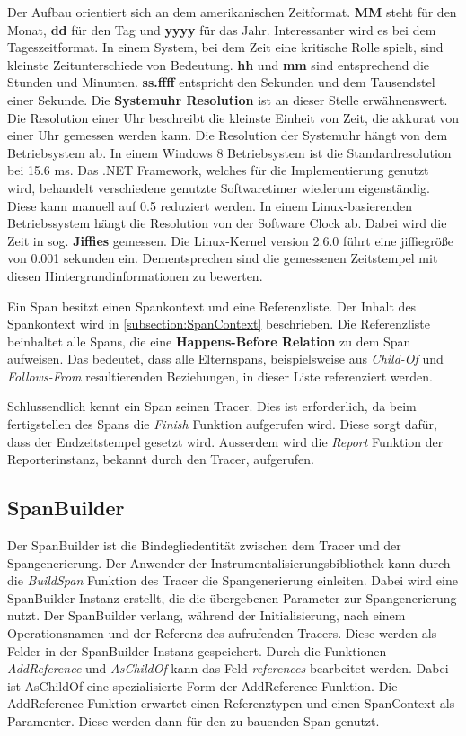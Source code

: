 Der Aufbau orientiert sich an dem amerikanischen Zeitformat. \textbf{MM} steht für den Monat, \textbf{dd} für den Tag und \textbf{yyyy} für das Jahr. Interessanter wird es bei dem Tageszeitformat. In einem System, bei dem Zeit eine kritische Rolle spielt, sind kleinste Zeitunterschiede von Bedeutung. \textbf{hh} und \textbf{mm} sind entsprechend die Stunden und Minunten. \textbf{ss.ffff} entspricht den Sekunden und dem Tausendstel einer Sekunde. Die \textbf{Systemuhr Resolution} ist an dieser Stelle erwähnenswert. Die Resolution einer Uhr beschreibt die kleinste Einheit von Zeit, die akkurat von einer Uhr gemessen werden kann. Die Resolution der Systemuhr hängt von dem Betriebsystem ab. In einem Windows 8  Betriebsystem ist die Standardresolution bei 15.6 ms. Das .NET Framework, welches für die Implementierung genutzt wird, behandelt verschiedene genutzte Softwaretimer wiederum eigenständig. Diese kann manuell auf 0.5 reduziert werden. In einem Linux-basierenden Betriebssystem hängt die Resolution von der Software Clock ab. Dabei wird die Zeit in sog. \textbf{Jiffies} gemessen. Die Linux-Kernel version 2.6.0 führt eine jiffiegröße von 0.001 sekunden ein. Dementsprechen sind die gemessenen Zeitstempel mit diesen Hintergrundinformationen zu bewerten.

Ein Span besitzt einen Spankontext und eine Referenzliste. Der Inhalt des Spankontext wird in \cref{subsection:SpanContext} beschrieben. Die Referenzliste beinhaltet alle Spans, die eine \textbf{Happens-Before Relation} zu dem Span aufweisen. Das bedeutet, dass alle Elternspans, beispielsweise aus \emph{Child-Of} und \emph{Follows-From} resultierenden Beziehungen, in dieser Liste referenziert werden.

Schlussendlich kennt ein Span seinen Tracer. Dies ist erforderlich, da beim fertigstellen des Spans die \emph{Finish} Funktion aufgerufen wird. Diese sorgt dafür, dass der Endzeitstempel gesetzt wird. Ausserdem wird die \emph{Report} Funktion der Reporterinstanz, bekannt durch den Tracer, aufgerufen.

\subsection{SpanBuilder}
\label{subsection:SpanBuilder}

Der SpanBuilder ist die Bindegliedentität zwischen dem Tracer und der Spangenerierung. Der Anwender der Instrumentalisierungsbibliothek kann durch die \emph{BuildSpan} Funktion des Tracer die Spangenerierung einleiten. Dabei wird eine SpanBuilder Instanz erstellt, die die übergebenen Parameter zur Spangenerierung nutzt. Der SpanBuilder verlang, während der Initialisierung, nach einem Operationsnamen und der Referenz des aufrufenden Tracers. Diese werden als Felder in der SpanBuilder Instanz gespeichert. Durch die Funktionen \emph{AddReference} und \emph{AsChildOf} kann das Feld \emph{references} bearbeitet werden. Dabei ist AsChildOf eine spezialisierte Form der AddReference Funktion. Die AddReference Funktion erwartet einen Referenztypen und einen SpanContext als Paramenter. Diese werden dann für den zu bauenden Span genutzt. 

